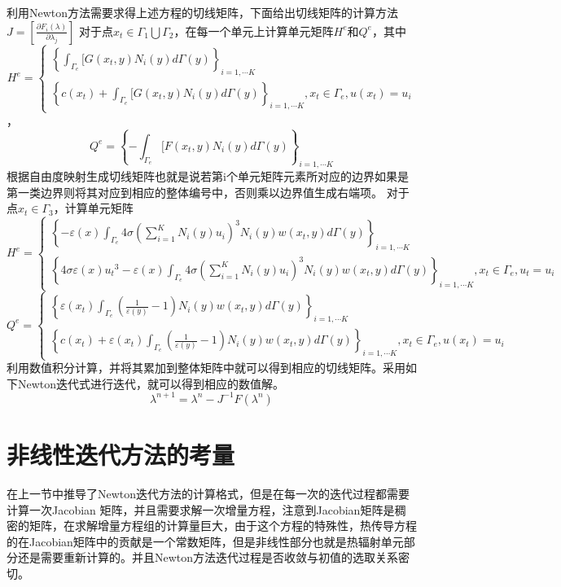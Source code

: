 利用Newton方法需要求得上述方程的切线矩阵，下面给出切线矩阵的计算方法
$J = \left[ {\frac{{\partial {F_i}(\lambda )}}{{\partial {\lambda _j}}}} \right]$
对于点${x_t} \in {\Gamma _1}\bigcup {{\Gamma _2}} $，在每一个单元上计算单元矩阵${H^e}$和${Q^e}$，其中
\[{H^e} = \left\{ {\begin{array}{*{20}{c}}
  {{{\left\{ {\int_{{\Gamma _e}}^{} {[G({x_t},y){N_i}(y)d\Gamma (y)} } \right\}}_{i = 1, \cdots K}}} \\ 
  {{{\left\{ {c({x_t}) + \int_{{\Gamma _e}}^{} {[G({x_t},y){N_i}(y)d\Gamma (y)} } \right\}}_{i = 1, \cdots K}},{x_t} \in {\Gamma _e},u({x_t}) = {u_i}} 
\end{array}} \right.\]，\[{Q^e} = {\left\{ { - \int_{{\Gamma _e}}^{} {[F({x_t},y){N_i}(y)d\Gamma (y)} } \right\}_{i = 1, \cdots K}}\]
根据自由度映射生成切线矩阵也就是说若第i个单元矩阵元素所对应的边界如果是第一类边界则将其对应到相应的整体编号中，否则乘以边界值生成右端项。
对于点${x_t} \in {\Gamma _3}$，计算单元矩阵
\[{H^e} = \left\{ {\begin{array}{*{20}{c}}
  {{{\left\{ { - \varepsilon (x)\int_{{\Gamma _e}} {4\sigma {{\left( {\sum\limits_{i = 1}^K {{N_i}(y){u_i}} } \right)}^3}{N_i}(y)w({x_t},y)d\Gamma (y)} } \right\}}_{i = 1, \cdots K}}} \\ 
  {{{\left\{ {4\sigma \varepsilon (x){u_t}^3 - \varepsilon (x)\int_{{\Gamma _e}} {4\sigma {{\left( {\sum\limits_{i = 1}^K {{N_i}(y){u_i}} } \right)}^3}{N_i}(y)w({x_t},y)d\Gamma (y)} } \right\}}_{i = 1, \cdots K}},{x_t} \in {\Gamma _e},{u_t} = {u_i}} 
\end{array}} \right.\]
\[{Q^e} = \left\{ {\begin{array}{*{20}{c}}
  {{{\left\{ {\varepsilon ({x_t})\int_{{\Gamma _e}} {\left( {\frac{1}{{\varepsilon (y)}} - 1} \right){N_i}(y)w({x_t},y)d\Gamma (y)} } \right\}}_{i = 1, \cdots K}}} \\ 
  {{{\left\{ {c({x_t}) + \varepsilon ({x_t})\int_{{\Gamma _e}} {\left( {\frac{1}{{\varepsilon (y)}} - 1} \right){N_i}(y)w({x_t},y)d\Gamma (y)} } \right\}}_{i = 1, \cdots K}},{x_t} \in {\Gamma _e},u({x_t}) = {u_i}} 
\end{array}} \right.\]
利用数值积分计算，并将其累加到整体矩阵中就可以得到相应的切线矩阵。采用如下Newton迭代式进行迭代，就可以得到相应的数值解。
\begin{equation}
	{\lambda ^{n + 1}} = {\lambda ^n} - {J^{ - 1}}F({\lambda ^n})
\end{equation}

\section{非线性迭代方法的考量}
在上一节中推导了Newton迭代方法的计算格式，但是在每一次的迭代过程都需要计算一次Jacobian 矩阵，并且需要求解一次增量方程，注意到Jacobian矩阵是稠密的矩阵，在求解增量方程组的计算量巨大，由于这个方程的特殊性，热传导方程的在Jacobian矩阵中的贡献是一个常数矩阵，但是非线性部分也就是热辐射单元部分还是需要重新计算的。并且Newton方法迭代过程是否收敛与初值的选取关系密切。

